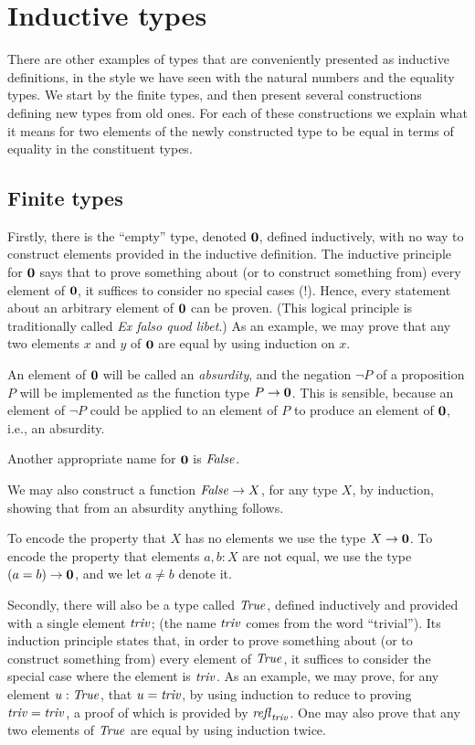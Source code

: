 \section{Inductive types}
\label{sec:inductive-types}

There are other examples of types that are conveniently presented as 
inductive definitions, in the style we have seen with the natural numbers
and the equality types.  We start by the finite types, and then
present several constructions defining new types from old ones.
For each of these constructions we explain what it means for two 
elements of the newly constructed type to be equal in terms of
equality in the constituent types.

\subsection{Finite types}
\label{sec:finite-types}
Firstly, there is the ``empty'' type, denoted $\mathbf{0} $, defined inductively, with no way to construct elements provided in the inductive
definition.  The inductive principle for $\mathbf{0} $ says that to prove something about (or to construct something from) every element of
$\mathbf{0} $, it suffices to consider no special cases (!).  Hence, every statement about an arbitrary element of $\mathbf{0} $ can be proven. (This logical principle is traditionally called {\em Ex falso quod libet}.) As
an example, we may prove that any two elements $x$ and $y$ of $\mathbf{0} $ are equal by using induction on $x$.

An element of $\mathbf{0} $ will be called an \emph{absurdity}, and the negation $\neg P$ of a proposition $P$ will be implemented as the function
type $P \to \mathbf{0} $.  This is sensible, because an element of $\neg P$ could be applied to an element of $P$ to produce an element of
$\mathbf{0} $, i.e., an absurdity.

Another appropriate name for $\mathbf{0} $ is $\mathop{\mathit{False}}$.

We may also construct a function $\mathop{\mathit{False}} \to X$, for any type $X$, by induction, showing that from an absurdity anything follows.

To encode the property that $X$ has no elements we use the type $X \to \mathbf{0} $.  To encode the property that elements $a,b:X$ are not equal,
we use the type $(a=b) \to \mathbf{0} $, and we let $a \ne b$ denote it.

Secondly, there will also be a type called $\mathop{\mathit{True}}$, defined inductively and provided with a single element $\mathop{\mathit{triv}}$; (the name $\mathop{\mathit{triv}}$ comes from the word
  ``trivial'').  Its induction principle
states that, in order to prove something about (or to construct something from) every element of $\mathop{\mathit{True}}$, it suffices to consider the special
case where the element is $\mathop{\mathit{triv}}$.  As an example, we may prove, for any element $u : \mathop{\mathit{True}}$, that $u=\mathop{\mathit{triv}}$, by using induction to reduce
to proving $\mathop{\mathit{triv}}=\mathop{\mathit{triv}}$, a proof of which is provided by $\mathop{{\it refl}_{\mathop{\mathit{triv}}}}$.  One may also prove that any two elements of $\mathop{\mathit{True}}$ are equal by using induction twice.

